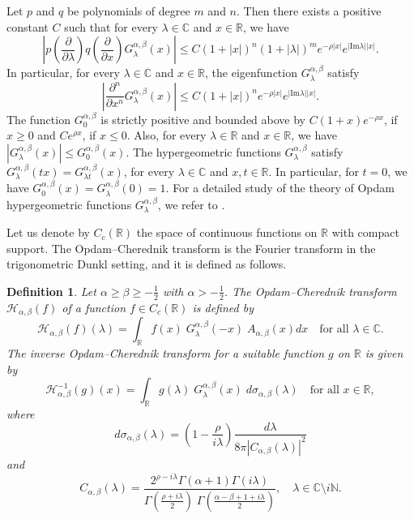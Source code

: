 \documentclass[a4paper,11pt, reqno]{amsart}
\theoremstyle{plain}
\newtheorem{Def}[theorem]{Definition}
\theoremstyle{definition}
\theoremstyle{remark}
\def \R{{\mathbb R}}
\def \C{{\mathbb C}}
\def\R{\mathbb R}
\def \H{{\mathcal H}}
\begin{document}
Let $p$ and $q$ be polynomials of degree $m$ and $n$. Then there exists a positive constant $C$ such that for every $\lambda \in \mathbb{C}$ and $x \in \mathbb{R}$, we have
\begin{equation}\label{eq01}
\left|p\left(\frac{\partial}{\partial \lambda}\right) q\left(\frac{\partial}{\partial x}\right) G^{\alpha, \beta}_\lambda(x)\right| \leq  C(1+|x|)^n(1+|\lambda|)^m e^{-\rho|x|} e^{|\mathrm{Im} \lambda||x|} .
\end{equation}
In particular, for every $ \lambda \in \C$ and $x \in  \R$, the eigenfunction
$G^{\alpha, \beta}_\lambda$ satisfy
\begin{equation}\label{eq04}
\left| \frac{\partial^n}{\partial x^n} G^{\alpha, \beta}_\lambda(x)\right| \leq  C(1+|x|)^n e^{-\rho|x|} e^{|\mathrm{Im} \lambda||x|}.
\end{equation}
The function $G^{\alpha, \beta}_0$ is strictly positive and bounded above by $C(1+x) e^{-\rho x}$, if $x \geq 0$ and $C e^{\rho x}$, if $x \leq 0$. Also, for every $\lambda \in \mathbb{R}$ and $x \in \mathbb{R}$, we have $  | G^{\alpha, \beta}_\lambda(x) | \leq G^{\alpha, \beta}_0(x)$. The hypergeometric functions $G^{\alpha, \beta}_\lambda$ satisfy $G^{\alpha, \beta}_{\lambda }(tx)=G^{\alpha, \beta}_{\lambda  t}(x)$,  for every $ \lambda \in \C $ and $x, t \in  \R$. In particular, for $t=0$, we have $G^{\alpha, \beta}_{0}(x)= G^{\alpha, \beta}_{\lambda }(0)=1$. For a detailed study of the theory of Opdam hypergeometric functions $G^{\alpha, \beta}_\lambda$, we refer to \cite{sch08}.

Let us denote by $C_c (\R)$ the space of continuous functions on $\R$ with compact support. The Opdam--Cherednik transform is the Fourier transform in the trigonometric Dunkl setting, and it is defined as follows.
\begin{Def}
Let $\alpha \geq \beta \geq -\frac{1}{2}$ with $\alpha > -\frac{1}{2}$. The Opdam--Cherednik transform $\mathcal{H}_{\alpha, \beta} (f)$ of a function $f \in C_c(\R)$ is defined by
\[ \H_{\alpha, \beta} (f) (\lambda)=\int_{\R} f(x)\; G^{\alpha, \beta}_\lambda(-x)\; A_{\alpha, \beta} (x) dx \quad \text{for all } \lambda \in \C. \]
The inverse Opdam--Cherednik transform for a suitable function $g$ on $\R$ is given by
\[ \H_{\alpha, \beta}^{-1} (g) (x)= \int_{\R} g(\lambda)\; G^{\alpha, \beta}_\lambda(x)\; d\sigma_{\alpha, \beta}(\lambda) \quad \text{for all } x \in \R, \]
where $$d\sigma_{\alpha, \beta}(\lambda)= \left(1- \dfrac{\rho}{i \lambda} \right) \dfrac{d \lambda}{8 \pi |C_{\alpha, \beta}(\lambda)|^2}$$ and 
$$C_{\alpha, \beta}(\lambda)= \dfrac{2^{\rho - i \lambda} \Gamma(\alpha+1) \Gamma(i \lambda)}{\Gamma \left(\frac{\rho + i \lambda}{2}\right)\; \Gamma\left(\frac{\alpha - \beta+1+i \lambda}{2}\right)}, \quad \lambda \in \C \setminus i \mathbb{N}.$$
\end{Def}
\end{document}
